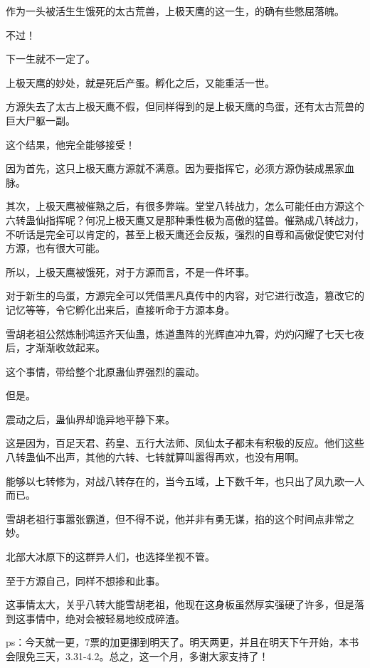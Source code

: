 \begin{this_body}
作为一头被活生生饿死的太古荒兽，上极天鹰的这一生，的确有些憋屈落魄。

不过！

下一生就不一定了。

上极天鹰的妙处，就是死后产蛋。孵化之后，又能重活一世。

方源失去了太古上极天鹰不假，但同样得到的是上极天鹰的鸟蛋，还有太古荒兽的巨大尸躯一副。

这个结果，他完全能够接受！

因为首先，这只上极天鹰方源就不满意。因为要指挥它，必须方源伪装成黑家血脉。

其次，上极天鹰被催熟之后，有很多弊端。堂堂八转战力，怎么可能任由方源这个六转蛊仙指挥呢？何况上极天鹰又是那种秉性极为高傲的猛兽。催熟成八转战力，不听话是完全可以肯定的，甚至上极天鹰还会反叛，强烈的自尊和高傲促使它对付方源，也有很大可能。

所以，上极天鹰被饿死，对于方源而言，不是一件坏事。

对于新生的鸟蛋，方源完全可以凭借黑凡真传中的内容，对它进行改造，篡改它的记忆等等，令它孵化出来后，直接听命于方源本身。

雪胡老祖公然炼制鸿运齐天仙蛊，炼道蛊阵的光辉直冲九霄，灼灼闪耀了七天七夜后，才渐渐收敛起来。

这个事情，带给整个北原蛊仙界强烈的震动。

但是。

震动之后，蛊仙界却诡异地平静下来。

这是因为，百足天君、药皇、五行大法师、凤仙太子都未有积极的反应。他们这些八转蛊仙不出声，其他的六转、七转就算叫嚣得再欢，也没有用啊。

能够以七转修为，对战八转存在的，当今五域，上下数千年，也只出了凤九歌一人而已。

雪胡老祖行事嚣张霸道，但不得不说，他并非有勇无谋，掐的这个时间点非常之妙。

北部大冰原下的这群异人们，也选择坐视不管。

至于方源自己，同样不想掺和此事。

这事情太大，关乎八转大能雪胡老祖，他现在这身板虽然厚实强硬了许多，但是落到这事情中，绝对会被轻易地绞成碎渣。

ps：今天就一更，7票的加更挪到明天了。明天两更，并且在明天下午开始，本书会限免三天，3.31-4.2。总之，这一个月，多谢大家支持了！

\end{this_body}

